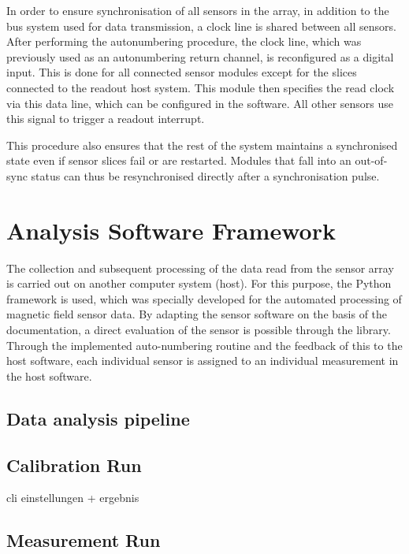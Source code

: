 \documentclass[conference]{IEEEtran}
\begin{document}
In order to ensure synchronisation of all sensors in the array, in addition to the bus system used for data transmission, a clock line is shared between all sensors.
After performing the autonumbering procedure, the clock line, which was previously used as an autonumbering return channel, is reconfigured as a digital input.
This is done for all connected sensor modules except for the slices connected to the readout host system.
This module then specifies the read clock via this data line, which can be configured in the software.
All other sensors use this signal to trigger a readout interrupt.

This procedure also ensures that the rest of the system maintains a synchronised state even if sensor slices fail or are restarted.
Modules that fall into an out-of-sync status can thus be resynchronised directly after a synchronisation pulse.


\section{Analysis Software Framework}

The collection and subsequent processing of the data read from the sensor array is carried out on another computer system (host).
For this purpose, the Python framework is used, which was specially developed for the automated processing of magnetic field sensor data.
By adapting the sensor software on the basis of the documentation, a direct evaluation of the sensor is possible through the library.
Through the implemented auto-numbering routine and the feedback of this to the host software, each individual sensor is assigned to an individual measurement in the host software.

\subsection{Data analysis pipeline}





\subsection{Calibration Run}

cli einstellungen
+ ergebnis

\subsection{Measurement Run}
\end{document}

